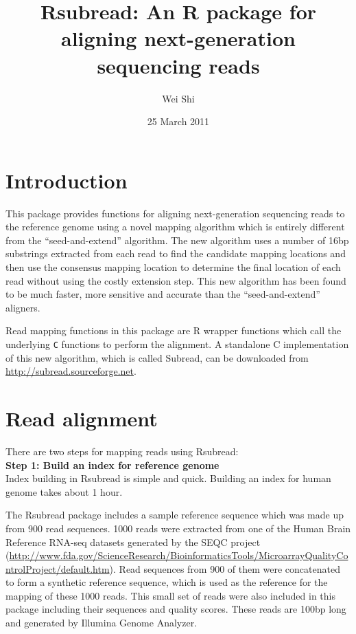 \documentclass[12pt]{article}
\newcommand{\C}[1]{{\texttt{#1}}}
\begin{document}
\title{Rsubread: An R package for aligning next-generation sequencing reads}
\author{Wei Shi}
\date{25 March 2011}
\maketitle

\section{Introduction}
This package provides functions for aligning next-generation sequencing reads to the reference genome using a novel mapping algorithm which is entirely different from the ``seed-and-extend'' algorithm.
The new algorithm uses a number of 16bp substrings extracted from each read to find the candidate mapping locations and then use the consensus mapping location to determine the final location of each read without using the costly extension step.
This new algorithm has been found to be much faster, more sensitive and accurate than the ``seed-and-extend'' aligners.

Read mapping functions in this package are R wrapper functions which call the underlying \C{C} functions to perform the alignment.
A standalone C implementation of this new algorithm, which is called Subread, can be downloaded from \url{http://subread.sourceforge.net}.

\section{Read alignment}
There are two steps for mapping reads using Rsubread: \\

{\noindent\bf Step 1: Build an index for reference genome\\}
Index building in Rsubread is simple and quick. 
Building an index for human genome takes about 1 hour.

The Rsubread package includes a sample reference sequence which was made up from 900 read sequences.
1000 reads were extracted from one of the Human Brain Reference RNA-seq datasets generated by the SEQC project (\url{http://www.fda.gov/ScienceResearch/BioinformaticsTools/MicroarrayQualityControlProject/default.htm}).
Read sequences from 900 of them were concatenated to form a synthetic reference sequence, which is used as the reference for the mapping of these 1000 reads.
This small set of reads were also included in this package including their sequences and quality scores.
These reads are 100bp long and generated by Illumina Genome Analyzer.
\end{document}
